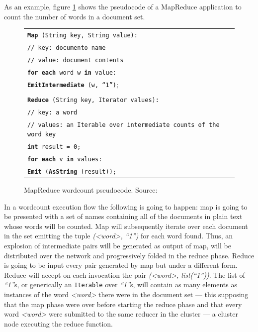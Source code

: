 \noindent As an example, figure \ref{fig:wordcount} shows the pseudocode of a MapReduce application to count the number of words in a document set.

\begin{figure}[tbp]
 \begin{center}
  \begin{tabular}{|l|}
   \hline
   \texttt{{\bf Map} (String key, String value):} \\
   \texttt{// key: documento name} \\
   \texttt{// value: document contents} \\
   \texttt{{\bf for each} word w {\bf in} value:} \\
   \texttt{{\bf EmitIntermediate} (w, ``1'')};\\ \\

   \texttt{{\bf Reduce} (String key, Iterator values):} \\
   \texttt{// key: a word} \\
   \texttt{// values: an Iterable over intermediate counts of the word key} \\
   \texttt{{\bf int} result = 0;} \\
   \texttt{{\bf for each} v {\bf in} values:} \\
   \texttt{{\bf Emit} ({\bf AsString} (result));} \\
   \hline
  \end{tabular}
  \caption{MapReduce wordcount pseudocode. Source: \cite{googlemapreduce}}
  \label{fig:wordcount}
 \end{center}
\end{figure}

In a wordcount execution flow the following is going to happen: map is going to be presented with a set of names containing all of the documents in plain text whose words will be counted. Map will subsequently iterate over each document in the set emitting the tuple \emph{(<word>, ``1'')} for each word found. Thus, an explosion of intermediate pairs will be generated as output of map, will be distributed over the network and progressively folded in the reduce phase. Reduce is going to be input every pair generated by map but under a different form. Reduce will accept on each invocation the pair \emph{(<word>, list(``1''))}. The list of \emph{``1''}s, or generically an \texttt{Iterable} over \emph{``1''}s, will contain as many elements as instances of the word \emph{<word>} there were in the document set --- this supposing that the map phase were over before starting the reduce phase and that every word \emph{<word>} were submitted to the same reducer in the cluster --- a cluster node executing the reduce function.

